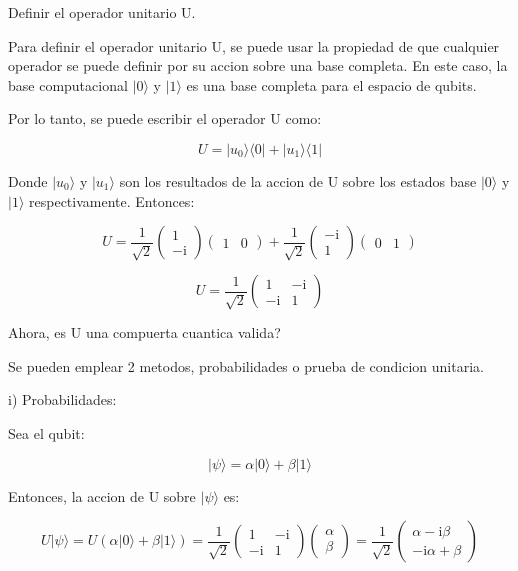 \documentclass[11pt]{article}
\newcommand{\ii}{\mathrm{i}}
\begin{document}
Definir el operador unitario U.

Para definir el operador unitario U, se puede usar la propiedad de que cualquier operador se puede definir por su accion sobre una base completa. En este caso, la base computacional $|0\rangle$ y $|1\rangle$ es una base completa para el espacio de qubits.

Por lo tanto, se puede escribir el operador U como:

\begin{equation}
    U = |u_0\rangle \langle 0| + |u_1\rangle \langle 1|
\end{equation}

Donde $|u_0\rangle$ y $|u_1\rangle$ son los resultados de la accion de U sobre los estados base $|0\rangle$ y $|1\rangle$ respectivamente. Entonces:

\begin{equation}
    U = \frac{1}{\sqrt{2}} \begin{pmatrix} 1 \\ -\ii \end{pmatrix} \begin{pmatrix} 1 & 0 \end{pmatrix} + \frac{1}{\sqrt{2}} \begin{pmatrix} -\ii \\ 1 \end{pmatrix} \begin{pmatrix} 0 & 1 \end{pmatrix}
\end{equation}

\begin{equation}
    U = \frac{1}{\sqrt{2}} \begin{pmatrix} 1 & -\ii \\ -\ii & 1 \end{pmatrix}
\end{equation}

Ahora, es U una compuerta cuantica valida? 

Se pueden emplear 2 metodos, probabilidades o prueba de condicion unitaria.

i) Probabilidades:

Sea el qubit:

\begin{equation}
    |\psi\rangle = \alpha |0\rangle + \beta |1\rangle
\end{equation}

Entonces, la accion de U sobre $|\psi\rangle$ es:

\begin{equation}
    U |\psi\rangle = U (\alpha |0\rangle + \beta |1\rangle) = \frac{1}{\sqrt{2}} \begin{pmatrix} 1 & -\ii \\ -\ii & 1 \end{pmatrix} \begin{pmatrix} \alpha \\ \beta \end{pmatrix} = \frac{1}{\sqrt{2}} \begin{pmatrix} \alpha - \ii \beta \\ -\ii \alpha + \beta \end{pmatrix}
\end{equation}
\end{document}
